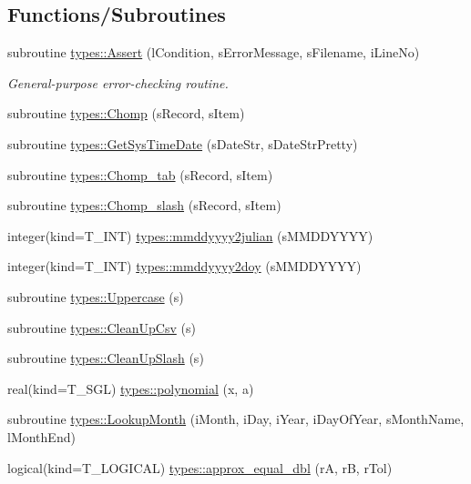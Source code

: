 \subsection*{Functions/Subroutines}
\begin{DoxyCompactItemize}
\item 
subroutine \hyperlink{namespacetypes_a3fffb62907acf0b6fb805c1e93ed18d9}{types::Assert} (lCondition, sErrorMessage, sFilename, iLineNo)
\begin{DoxyCompactList}\small\item\em General-\/purpose error-\/checking routine. \item\end{DoxyCompactList}\item 
subroutine \hyperlink{namespacetypes_af6e75e8cc451db57eac17135489f6112}{types::Chomp} (sRecord, sItem)
\item 
subroutine \hyperlink{namespacetypes_a69b9c0fe76bf005ec3d97b9fd7eb9f41}{types::GetSysTimeDate} (sDateStr, sDateStrPretty)
\item 
subroutine \hyperlink{namespacetypes_a32b4376099e979b8ed2e52d2b7cbd1f2}{types::Chomp\_\-tab} (sRecord, sItem)
\item 
subroutine \hyperlink{namespacetypes_a04f9fe9c15a8f96624fb026b510f6a80}{types::Chomp\_\-slash} (sRecord, sItem)
\item 
integer(kind=T\_\-INT) \hyperlink{namespacetypes_a43ae0de695c72e499737820794f9629e}{types::mmddyyyy2julian} (sMMDDYYYY)
\item 
integer(kind=T\_\-INT) \hyperlink{namespacetypes_a5556730044ced12a261f38a13fe05eb8}{types::mmddyyyy2doy} (sMMDDYYYY)
\item 
subroutine \hyperlink{namespacetypes_a0bebcf106096e896fc12abc9b21825af}{types::Uppercase} (s)
\item 
subroutine \hyperlink{namespacetypes_a7fdd7b312cad86dbca730b5fc1fb205a}{types::CleanUpCsv} (s)
\item 
subroutine \hyperlink{namespacetypes_a52444756471a187f395929b01ec6175c}{types::CleanUpSlash} (s)
\item 
real(kind=T\_\-SGL) \hyperlink{namespacetypes_ad041e93921c33efc5f7b8cb099c9f3df}{types::polynomial} (x, a)
\item 
subroutine \hyperlink{namespacetypes_a7f346956c828d5fab15a3d5d087a10a8}{types::LookupMonth} (iMonth, iDay, iYear, iDayOfYear, sMonthName, lMonthEnd)
\item 
logical(kind=T\_\-LOGICAL) \hyperlink{namespacetypes_a3209cf8641ab770d9f6929cd303442a6}{types::approx\_\-equal\_\-dbl} (rA, rB, rTol)

\end{DoxyCompactItemize}
